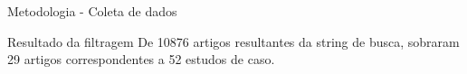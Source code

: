 \begin{frame}{Metodologia - Coleta de dados}

\begin{block}{Resultado da filtragem}
De 10876 artigos resultantes da string de busca, sobraram 29 artigos correspondentes a 52 estudos de caso.
\end{block}
\end{frame}